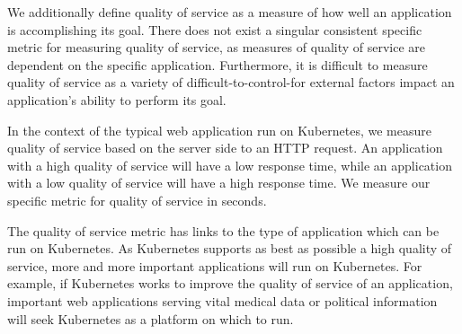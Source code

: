 We additionally define quality of service as a measure of how well an application
is accomplishing its goal. There does not exist a singular consistent specific
metric for measuring quality of service, as measures of quality of service are dependent on
the specific application. Furthermore, it is difficult to measure quality of
service as a variety of difficult-to-control-for external factors impact an
application's ability to perform its goal.

In the context of the typical web application run on Kubernetes, we measure
quality of service based on the server side
 to an HTTP request. An application
with a high quality of service will have a low response time, while an
application with a low quality of service will have a high response time. We
measure our specific metric for quality of service in seconds.

The quality of service metric has links to the type of application which can be
run on Kubernetes. As Kubernetes supports as best as possible a high quality of
service, more and more important applications will run on Kubernetes. For
example, if Kubernetes works to improve the quality of service of an
application, important web applications serving vital medical data or political
information will seek Kubernetes as a platform on which to run.
